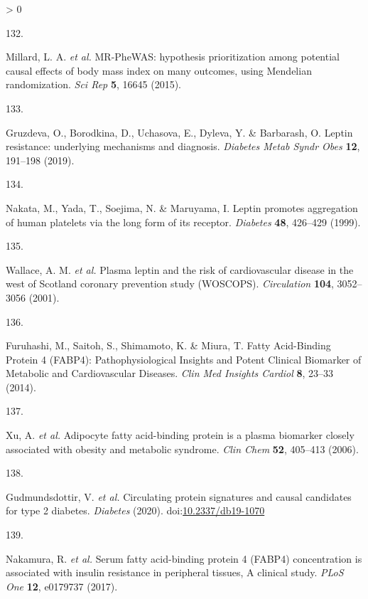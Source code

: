 \documentclass[11pt,twoside]{bristolthesis}
\newlength{\cslhangindent}
\newlength{\csllabelwidth}
\newenvironment{CSLReferences}[2] %
 {%
  \setlength{\parindent}{0pt}
  \ifodd #1 \everypar{\setlength{\hangindent}{\cslhangindent}}\ignorespaces\fi
  \ifnum #2 > 0
  \setlength{\parskip}{#2\baselineskip}
  \fi
 }%
 {}
\newcommand{\CSLLeftMargin}[1]{\parbox[t]{\csllabelwidth}{#1}}
\newcommand{\CSLRightInline}[1]{\parbox[t]{\linewidth - \csllabelwidth}{#1}\break}
\begin{document}
\begin{CSLReferences}{0}{0}
\leavevmode\hypertarget{ref-Millard2015}{}%
\CSLLeftMargin{132. }
\CSLRightInline{Millard, L. A. \emph{et al.} {MR-PheWAS: hypothesis prioritization among potential causal effects of body mass index on many outcomes, using Mendelian randomization}. \emph{Sci Rep} \textbf{5}, 16645 (2015).}

\leavevmode\hypertarget{ref-Gruzdeva2019a}{}%
\CSLLeftMargin{133. }
\CSLRightInline{Gruzdeva, O., Borodkina, D., Uchasova, E., Dyleva, Y. \& Barbarash, O. {Leptin resistance: underlying mechanisms and diagnosis}. \emph{Diabetes Metab Syndr Obes} \textbf{12}, 191--198 (2019).}

\leavevmode\hypertarget{ref-Nakata1999}{}%
\CSLLeftMargin{134. }
\CSLRightInline{Nakata, M., Yada, T., Soejima, N. \& Maruyama, I. {Leptin promotes aggregation of human platelets via the long form of its receptor}. \emph{Diabetes} \textbf{48}, 426--429 (1999).}

\leavevmode\hypertarget{ref-Wallace2001}{}%
\CSLLeftMargin{135. }
\CSLRightInline{Wallace, A. M. \emph{et al.} {Plasma leptin and the risk of cardiovascular disease in the west of Scotland coronary prevention study (WOSCOPS)}. \emph{Circulation} \textbf{104}, 3052--3056 (2001).}

\leavevmode\hypertarget{ref-Furuhashi2014}{}%
\CSLLeftMargin{136. }
\CSLRightInline{Furuhashi, M., Saitoh, S., Shimamoto, K. \& Miura, T. {Fatty Acid-Binding Protein 4 (FABP4): Pathophysiological Insights and Potent Clinical Biomarker of Metabolic and Cardiovascular Diseases}. \emph{Clin Med Insights Cardiol} \textbf{8}, 23--33 (2014).}

\leavevmode\hypertarget{ref-Xu2006}{}%
\CSLLeftMargin{137. }
\CSLRightInline{Xu, A. \emph{et al.} {Adipocyte fatty acid-binding protein is a plasma biomarker closely associated with obesity and metabolic syndrome}. \emph{Clin Chem} \textbf{52}, 405--413 (2006).}

\leavevmode\hypertarget{ref-Gudmundsdottir2020}{}%
\CSLLeftMargin{138. }
\CSLRightInline{Gudmundsdottir, V. \emph{et al.} {Circulating protein signatures and causal candidates for type 2 diabetes}. \emph{Diabetes} (2020). doi:\href{https://doi.org/10.2337/db19-1070}{10.2337/db19-1070}}

\leavevmode\hypertarget{ref-Nakamura2017}{}%
\CSLLeftMargin{139. }
\CSLRightInline{Nakamura, R. \emph{et al.} {Serum fatty acid-binding protein 4 (FABP4) concentration is associated with insulin resistance in peripheral tissues, A clinical study}. \emph{PLoS One} \textbf{12}, e0179737 (2017).}


\end{CSLReferences}
\end{document}
